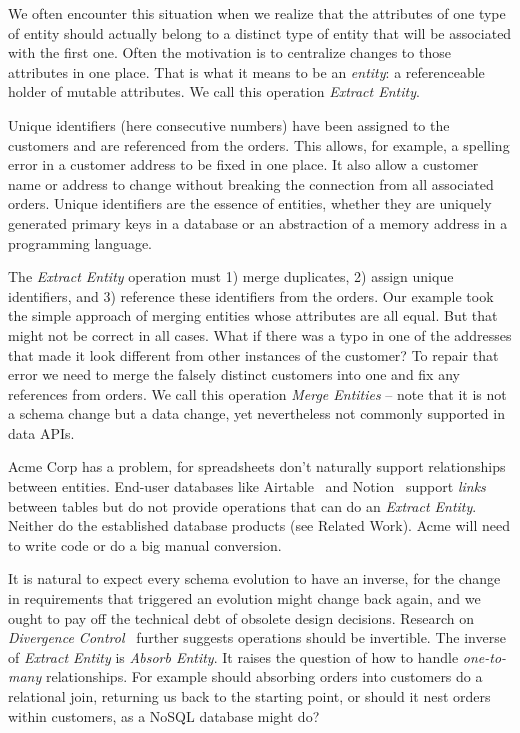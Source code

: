 \documentclass[english,submission]{programming}
\begin{document}
We often encounter this situation when we realize that the attributes of one type of entity should actually belong to a distinct type of entity that will be associated with the first one. Often the motivation is to centralize changes to those attributes in one place. That is what it means to be an \textit{entity}: a referenceable holder of mutable attributes. We call this operation \textit{Extract Entity}.

Unique identifiers (here consecutive numbers) have been assigned to the customers and are referenced from the orders. This allows, for example, a spelling error in a customer address to be fixed in one place. It also allow a customer name or address to change without breaking the connection from all associated orders. Unique identifiers are the essence of entities, whether they are uniquely generated primary keys in a database or an abstraction of a memory address in a programming language.

The \textit{Extract Entity} operation must 1) merge duplicates, 2) assign unique identifiers, and 3) reference these identifiers from the orders. Our example took the simple approach of merging entities whose attributes are all equal. But that might not be correct in all cases. What if there was a typo in one of the addresses that made it look different from other instances of the customer? To repair that error we need to merge the falsely distinct customers into one and fix any references from orders. We call this operation \textit{Merge Entities} -- note that it is not a schema change but a data change, yet nevertheless not commonly supported in data APIs.

Acme Corp has a problem, for spreadsheets don't naturally support relationships between entities. End-user databases like Airtable~\cite{airtable} and Notion~\cite{notion} support \textit{links} between tables but do not provide operations that can do an \textit{Extract Entity}. Neither do the established database products (see Related Work). Acme will need to write code or do a big manual conversion.

It is natural to expect every schema evolution to have an inverse, for the change in requirements that triggered an evolution might change back again, and we ought to pay off the technical debt of obsolete design decisions. Research on \textit{Divergence Control}~\cite{Foster2007, herrmann17, chillon22} further suggests operations should be invertible.
The inverse of \textit{Extract Entity} is \textit{Absorb Entity}. It raises the question of how to handle \textit{one-to-many} relationships. For example should absorbing orders into customers do a relational join, returning us back to the starting point, or should it nest orders within customers, as a NoSQL database might do?
\end{document}
